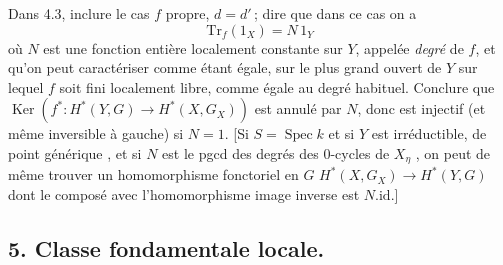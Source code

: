 \documentclass[11pt,a4paper]{article}
\begin{document}
Dans 4.3, inclure le cas $f$ propre, $d = d'$\,; dire que dans ce
 cas on a
\[
\mathrm{Tr}_f(1_X) = N\, 1_Y
\]
où $N$ est une fonction entière localement constante sur $Y$, appelée
\emph{degré} de $f$, et qu'on peut caractériser comme étant égale, sur le
plus grand ouvert de $Y$ sur lequel $f$ soit fini localement libre, comme
égale au degré habituel. Conclure que $\operatorname{Ker}(f^{*}\colon
H^{*}(Y, G) \to H^{*}(X, G_X))$ est annulé par $N$, donc  est
injectif (et même inversible à gauche) si $N = 1$. [Si $S = \operatorname{Spec}
k$ et si $Y$ est irréductible, de point générique \add{$\eta$},
 et si $N$ est le pgcd des degrés des
$0$-cycles de $X_{\eta}$ \add{$\neq \varnothing$}, on peut de même trouver
un homomorphisme\supplied{,} fonctoriel en $G$\add{,} $H^{*}(X, G_X) \to
H^{*}(Y, G)$ dont le composé avec l'homomorphisme image inverse est
$N.\mathrm{id}$.]

\subsection*{5. Classe fondamentale locale.}
\end{document}

